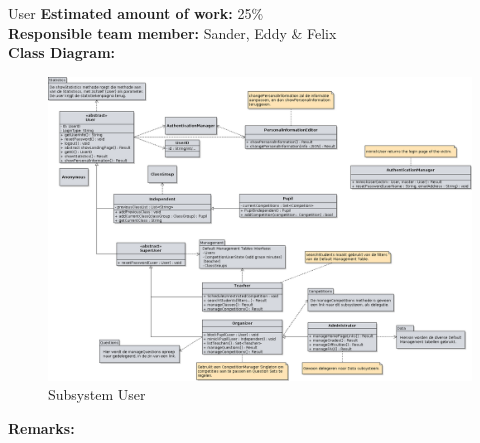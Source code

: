 \begin{subsection}{User}
	\textbf{Estimated amount of work:} 25\% \\
    \textbf{Responsible team member:} Sander, Eddy \& Felix \\
	\textbf{Class Diagram:} \\
	
	\begin{figure}[!h]
	  \centering
		\includegraphics[width=1\textwidth]{../class_diagrams/user.png}
	  \caption{Subsystem User}
	  \label{subsystem_question}
	\end{figure}
	
	\textbf{Remarks:} \\
	
\end{subsection}
